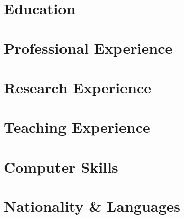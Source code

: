 \documentclass{resume}
\begin{document}
    

\section{Education}
    
    

\section{Professional Experience}
    

\section{Research Experience}
    

\section{Teaching Experience}
    
    

\section{Computer Skills}
    
    
    
    
    
\section{Nationality \& Languages}
	
\end{document}
